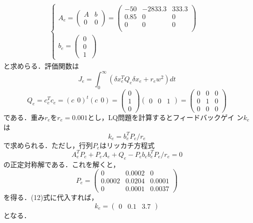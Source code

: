 \documentclass[a4paper,12pt]{jarticle}
\begin{document}
\begin{eqnarray}
 \begin{cases}
A_e=
  \begin{pmatrix}
   A & b \\
   0 & 0
  \end{pmatrix}
  =
  \begin{pmatrix}
   -50  & -2833.3 & 333.3 \\
   0.85 & 0       & 0   \\
   0    &  0      &   0\\
  \end{pmatrix}
  & \\
  b_e =
  \begin{pmatrix}
  \ 0 \ \\
  \ 0 \ \\
  \ 1 \
  \end{pmatrix}
 \end{cases}
\end{eqnarray}
%
と求めらる．評価関数は
%
\begin{equation}
J_e = \int_{0}^{\infty} (\delta x_e^{T}Q_{e}\delta x_e + r_e w^2 ) dt 
\end{equation}
%
\begin{equation}
 Q_e = c_e^Tc_e = (c \ \ 0)^t(c \ \ 0) =
\begin{pmatrix}
 0 \\
 1 \\
 0
\end{pmatrix}
%
\begin{pmatrix}
 0 & 0 & 1
\end{pmatrix}
%
=
%
\begin{pmatrix}
 0 & 0 & 0 \\
 0 & 1 & 0 \\
 0 & 0 & 0
\end{pmatrix}
\end{equation}
%
である．重み$r_e$を$r_e=0.001$とし，LQ問題を計算するとフィードバックゲイ
ン$k_e$は
%
\begin{equation}
 k_e = b_e^{T}P_e/r_e
\end{equation}
%
で求められる．ただし，行列$P_e$はリッカチ方程式
%
\begin{equation}
 A_e^{T}P_e + P_e A_e + Q_e - P_e b_e b_e^T P_e /r_e = 0
\end{equation}
%
の正定対称解である．これを解くと，
%
\begin{equation}
 P_e =
  \begin{pmatrix}
   0      & 0.0002 & 0 \\
   0.0002 & 0.0204 & 0.0001 \\
   0      & 0.0001 & 0.0037
  \end{pmatrix}
\end{equation}
%
を得る．(12)式に代入すれば，
%
\begin{equation}
 k_e =
  \begin{pmatrix}
   0 & 0.1 & 3.7
  \end{pmatrix}
\end{equation}
%
となる．
\end{document}
